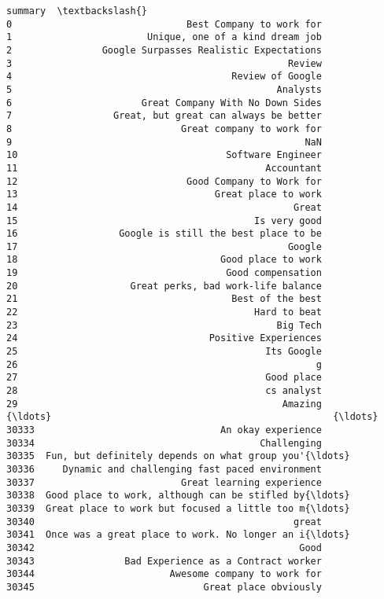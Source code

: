 \documentclass[11pt]{article}
\begin{document}
\begin{tcolorbox}[breakable, boxrule=.5pt, size=fbox, pad at break*=1mm, opacityfill=0]
\begin{Verbatim}[commandchars=\\\{\}]
                                                 summary  \textbackslash{}
0                               Best Company to work for
1                        Unique, one of a kind dream job
2                Google Surpasses Realistic Expectations
3                                                 Review
4                                       Review of Google
5                                               Analysts
6                       Great Company With No Down Sides
7                  Great, but great can always be better
8                              Great company to work for
9                                                    NaN
10                                     Software Engineer
11                                            Accountant
12                              Good Company to Work for
13                                   Great place to work
14                                                 Great
15                                          Is very good
16                  Google is still the best place to be
17                                                Google
18                                    Good place to work
19                                     Good compensation
20                    Great perks, bad work-life balance
21                                      Best of the best
22                                          Hard to beat
23                                              Big Tech
24                                  Positive Experiences
25                                            Its Google
26                                                     g
27                                            Good place
28                                            cs analyst
29                                               Amazing
{\ldots}                                                  {\ldots}
30333                                 An okay experience
30334                                        Challenging
30335  Fun, but definitely depends on what group you'{\ldots}
30336     Dynamic and challenging fast paced environment
30337                          Great learning experience
30338  Good place to work, although can be stifled by{\ldots}
30339  Great place to work but focused a little too m{\ldots}
30340                                              great
30341  Once was a great place to work. No longer an i{\ldots}
30342                                               Good
30343                Bad Experience as a Contract worker
30344                        Awesome company to work for
30345                              Great place obviously

\end{Verbatim}
\end{tcolorbox}
\end{document}
